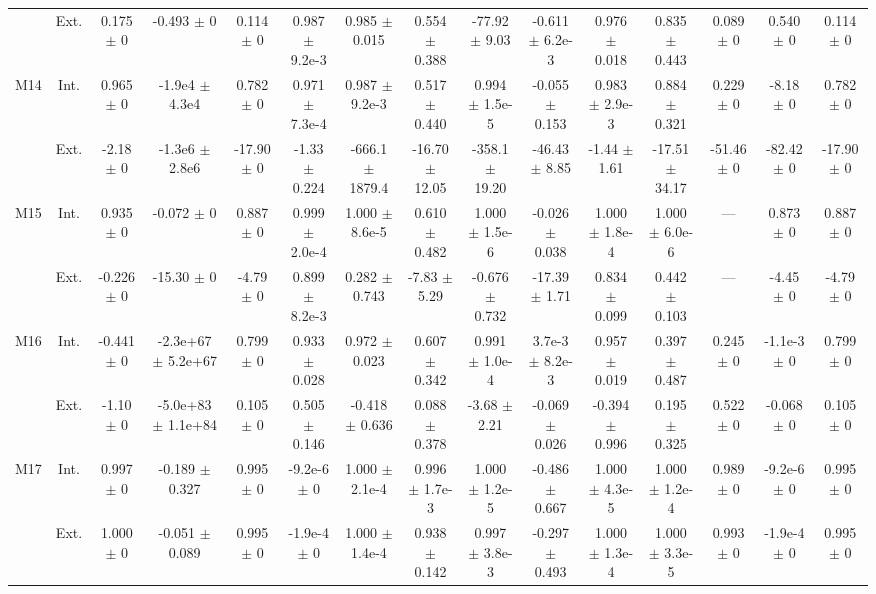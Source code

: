 \begin{table}[htbp]
{\begin{tabular}{@{}ccccccccccccccc@{}}
 & Ext. & 0.175 $\pm$ 0 & -0.493 $\pm$ 0 & 0.114 $\pm$ 0 & 0.987 $\pm$ 9.2e-3 & 0.985 $\pm$ 0.015 & 0.554 $\pm$ 0.388 & -77.92 $\pm$ 9.03 & -0.611 $\pm$ 6.2e-3 & 0.976 $\pm$ 0.018 & 0.835 $\pm$ 0.443 & 0.089 $\pm$ 0 & 0.540 $\pm$ 0 & 0.114 $\pm$ 0 \\
\cline{2-15}
\multirow{2}{*}{M14} & Int. & 0.965 $\pm$ 0 & -1.9e4 $\pm$ 4.3e4 & 0.782 $\pm$ 0 & 0.971 $\pm$ 7.3e-4 & 0.987 $\pm$ 9.2e-3 & 0.517 $\pm$ 0.440 & 0.994 $\pm$ 1.5e-5 & -0.055 $\pm$ 0.153 & 0.983 $\pm$ 2.9e-3 & 0.884 $\pm$ 0.321 & 0.229 $\pm$ 0 & -8.18 $\pm$ 0 & 0.782 $\pm$ 0 \\
 & Ext. & -2.18 $\pm$ 0 & -1.3e6 $\pm$ 2.8e6 & -17.90 $\pm$ 0 & -1.33 $\pm$ 0.224 & -666.1 $\pm$ 1879.4 & -16.70 $\pm$ 12.05 & -358.1 $\pm$ 19.20 & -46.43 $\pm$ 8.85 & -1.44 $\pm$ 1.61 & -17.51 $\pm$ 34.17 & -51.46 $\pm$ 0 & -82.42 $\pm$ 0 & -17.90 $\pm$ 0 \\
\cline{2-15}
\multirow{2}{*}{M15} & Int. & 0.935 $\pm$ 0 & -0.072 $\pm$ 0 & 0.887 $\pm$ 0 & 0.999 $\pm$ 2.0e-4 & 1.000 $\pm$ 8.6e-5 & 0.610 $\pm$ 0.482 & 1.000 $\pm$ 1.5e-6 & -0.026 $\pm$ 0.038 & 1.000 $\pm$ 1.8e-4 & 1.000 $\pm$ 6.0e-6 & --- & 0.873 $\pm$ 0 & 0.887 $\pm$ 0 \\
 & Ext. & -0.226 $\pm$ 0 & -15.30 $\pm$ 0 & -4.79 $\pm$ 0 & 0.899 $\pm$ 8.2e-3 & 0.282 $\pm$ 0.743 & -7.83 $\pm$ 5.29 & -0.676 $\pm$ 0.732 & -17.39 $\pm$ 1.71 & 0.834 $\pm$ 0.099 & 0.442 $\pm$ 0.103 & --- & -4.45 $\pm$ 0 & -4.79 $\pm$ 0 \\
\cline{2-15}
\multirow{2}{*}{M16} & Int. & -0.441 $\pm$ 0 & -2.3e+67 $\pm$ 5.2e+67 & 0.799 $\pm$ 0 & 0.933 $\pm$ 0.028 & 0.972 $\pm$ 0.023 & 0.607 $\pm$ 0.342 & 0.991 $\pm$ 1.0e-4 & 3.7e-3 $\pm$ 8.2e-3 & 0.957 $\pm$ 0.019 & 0.397 $\pm$ 0.487 & 0.245 $\pm$ 0 & -1.1e-3 $\pm$ 0 & 0.799 $\pm$ 0 \\
 & Ext. & -1.10 $\pm$ 0 & -5.0e+83 $\pm$ 1.1e+84 & 0.105 $\pm$ 0 & 0.505 $\pm$ 0.146 & -0.418 $\pm$ 0.636 & 0.088 $\pm$ 0.378 & -3.68 $\pm$ 2.21 & -0.069 $\pm$ 0.026 & -0.394 $\pm$ 0.996 & 0.195 $\pm$ 0.325 & 0.522 $\pm$ 0 & -0.068 $\pm$ 0 & 0.105 $\pm$ 0 \\
\cline{2-15}
\multirow{2}{*}{M17} & Int. & 0.997 $\pm$ 0 & -0.189 $\pm$ 0.327 & 0.995 $\pm$ 0 & -9.2e-6 $\pm$ 0 & 1.000 $\pm$ 2.1e-4 & 0.996 $\pm$ 1.7e-3 & 1.000 $\pm$ 1.2e-5 & -0.486 $\pm$ 0.667 & 1.000 $\pm$ 4.3e-5 & 1.000 $\pm$ 1.2e-4 & 0.989 $\pm$ 0 & -9.2e-6 $\pm$ 0 & 0.995 $\pm$ 0 \\
 & Ext. & 1.000 $\pm$ 0 & -0.051 $\pm$ 0.089 & 0.995 $\pm$ 0 & -1.9e-4 $\pm$ 0 & 1.000 $\pm$ 1.4e-4 & 0.938 $\pm$ 0.142 & 0.997 $\pm$ 3.8e-3 & -0.297 $\pm$ 0.493 & 1.000 $\pm$ 1.3e-4 & 1.000 $\pm$ 3.3e-5 & 0.993 $\pm$ 0 & -1.9e-4 $\pm$ 0 & 0.995 $\pm$ 0 \\

\end{tabular}}
\end{table}
